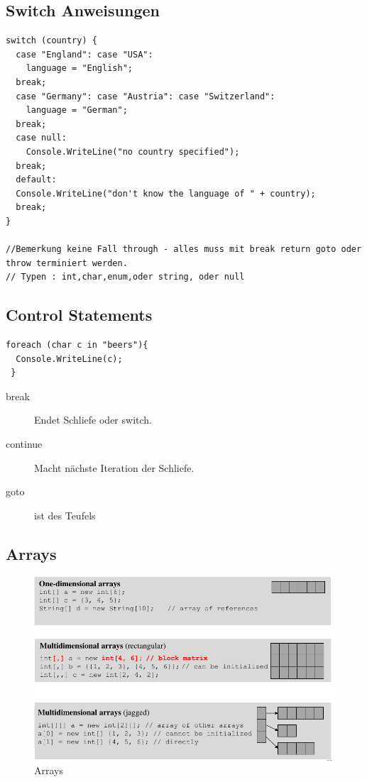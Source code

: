 \documentclass[a4paper,10pt]{scrartcl}
\begin{document}
\subsection{Switch Anweisungen}
\begin{lstlisting}[caption=Switch Anweisung]
 switch (country) {
  case "England": case "USA":
    language = "English";
  break;
  case "Germany": case "Austria": case "Switzerland":
    language = "German";
  break;
  case null:
    Console.WriteLine("no country specified");
  break;
  default:
  Console.WriteLine("don't know the language of " + country);
  break;
}

//Bemerkung keine Fall through - alles muss mit break return goto oder throw terminiert werden.
// Typen : int,char,enum,oder string, oder null
\end{lstlisting}

\subsection{Control Statements}

\begin{lstlisting}[caption=foreach Beispiel]
 foreach (char c in "beers"){
  Console.WriteLine(c);
 }
\end{lstlisting}

\begin{description}
 \item [break] Endet Schliefe oder switch.
 \item [continue] Macht nächste Iteration der Schliefe.
 \item [goto] ist des Teufels
\end{description}

\subsection{Arrays}
\begin{figure}[h]
 \centering
 \includegraphics[scale=0.5]{./arrays.png}
 \caption{Arrays}
\end{figure}
\end{document}
